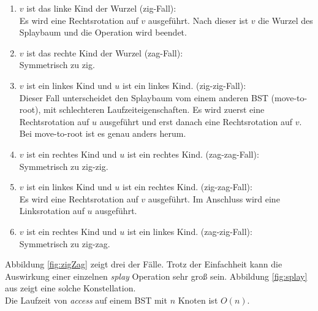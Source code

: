\documentclass[a4paper,12pt]{article}
\begin{document}
\begin{enumerate}
	\item $v$ ist das linke Kind der Wurzel (zig-Fall):\\
	Es wird eine Rechtsrotation auf $v$ ausgeführt. Nach dieser ist $v$ die Wurzel des Splaybaum und die Operation wird beendet. 
	\item $v$ ist das rechte Kind der Wurzel (zag-Fall):\\
	Symmetrisch zu zig.
	\item $v$ ist ein linkes Kind und $u$ ist ein linkes Kind. (zig-zig-Fall):\\
	Dieser Fall unterscheidet den Splaybaum vom einem anderen BST (move-to-root), mit schlechteren Laufzeiteigenschaften. Es wird zuerst eine Rechtsrotation auf $u$ ausgeführt und erst danach eine Rechtsrotation auf $v$. Bei move-to-root  ist es genau anders herum. 
	\item $v$ ist ein rechtes Kind und $u
	$ ist ein rechtes Kind. (zag-zag-Fall):\\
	Symmetrisch zu zig-zig.
	\item $v$ ist ein linkes Kind und $u$ ist ein rechtes Kind. (zig-zag-Fall):\\
	Es wird eine Rechtsrotation auf $v$ ausgeführt. Im Anschluss wird eine Linksrotation auf $u$ ausgeführt.
	\item $v$ ist ein rechtes Kind und $u$ ist ein linkes Kind. (zag-zig-Fall):\\
	Symmetrisch zu zig-zag.
	
\end{enumerate}
Abbildung  \ref{fig:zigZag} zeigt drei der Fälle. Trotz der Einfachheit kann die Auswirkung einer einzelnen \textit{splay} Operation sehr groß sein. Abbildung \ref{fig:splay} aus \cite{splay} zeigt eine solche Konstellation. \\
Die Laufzeit von \textit{access} auf einem BST mit $n$ Knoten ist $O\left(n\right)$.
\end{document}
